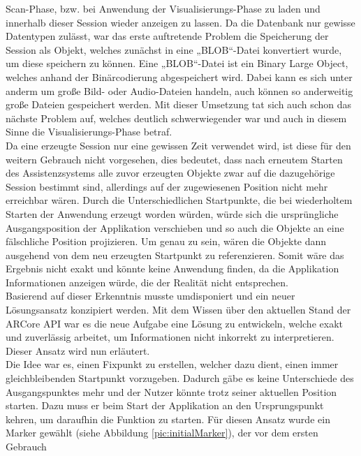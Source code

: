 Scan-Phase, bzw. bei Anwendung der Visualisierungs-Phase zu laden und innerhalb dieser Session wieder anzeigen zu lassen. Da die Datenbank nur gewisse Datentypen 
zulässt, war das erste auftretende Problem die Speicherung der Session als Objekt, welches zunächst in eine „BLOB“-Datei konvertiert wurde, um diese speichern 
zu können. Eine „BLOB“-Datei ist ein Binary Large Object, welches anhand der Binärcodierung abgespeichert wird. Dabei kann es sich unter anderm um große 
Bild- oder Audio-Dateien handeln, auch können so anderweitig große Dateien gespeichert werden. Mit dieser Umsetzung tat sich auch schon das nächste Problem auf, 
welches deutlich schwerwiegender war und auch in diesem Sinne die Visualisierungs-Phase betraf. 
\\ 
Da eine erzeugte Session nur eine gewissen Zeit verwendet wird, ist diese für den weitern Gebrauch nicht vorgesehen, dies bedeutet, dass nach erneutem Starten 
des Assistenzsystems alle zuvor erzeugten Objekte zwar auf die dazugehörige Session bestimmt sind, allerdings auf der zugewiesenen Position 
nicht mehr erreichbar wären. Durch die Unterschiedlichen Startpunkte, die bei wiederholtem Starten der Anwendung erzeugt worden würden, 
würde sich die ursprüngliche Ausgangsposition der Applikation verschieben und so auch die Objekte an eine fälschliche Position projizieren. Um genau zu sein, 
wären die Objekte dann ausgehend von dem neu erzeugten Startpunkt zu referenzieren. Somit wäre das 
Ergebnis nicht exakt und könnte keine Anwendung finden, da die Applikation Informationen anzeigen würde, die der Realität nicht entsprechen. 
\\ 
Basierend auf dieser Erkenntnis musste umdisponiert und ein neuer Lösungsansatz konzipiert werden. Mit dem Wissen über den aktuellen Stand der ARCore \acs{API} 
war es die neue Aufgabe eine Lösung zu entwickeln, welche exakt und zuverlässig arbeitet, um Informationen nicht inkorrekt zu interpretieren. 
\\ 
Dieser Ansatz wird nun erläutert.
\\ 
\linebreak
Die Idee war es, einen Fixpunkt zu erstellen, welcher dazu dient, einen immer gleichbleibenden Startpunkt vorzugeben. Dadurch gäbe es keine Unterschiede des 
Ausgangspunktes mehr und der Nutzer könnte trotz seiner aktuellen Position starten. Dazu muss er beim Start der Applikation an den Ursprungspunkt kehren, 
um daraufhin die Funktion zu starten. Für diesen Ansatz wurde ein Marker gewählt (siehe Abbildung \ref{pic:initialMarker}), der vor dem ersten Gebrauch 
